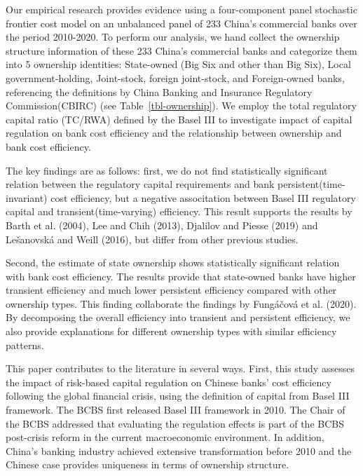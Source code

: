 \documentclass[
  12pt,
  a4paper,
]{scrreprt}
\begin{document}
{{{{Our empirical research provides evidence using a four-component panel
stochastic frontier cost model on an unbalanced panel of 233 China's
commercial banks over the period 2010-2020. To perform our analysis, we
hand collect the ownership structure information of these 233 China's
commercial banks and categorize them into 5 ownership identities:
State-owned (Big Six and other than Big Six), Local government-holding,
Joint-stock, foreign joint-stock, and Foreign-owned banks, referencing
the definitions by China Banking and Insurance Regulatory
Commission(CBIRC) (see Table~\ref{tbl-ownership}). We employ the total
regulatory capital ratio (TC/RWA) defined by the Basel III to
investigate impact of capital regulation on bank cost efficiency and the
relationship between ownership and bank cost efficiency.

The key findings are as follows: first, we do not find statistically
significant relation between the regulatory capital requirements and
bank persistent(time-invariant) cost efficiency, but a negative
associtation between Basel III regulatory capital and
transient(time-varying) efficiency. This result supports the results by
Barth et al. (2004), Lee and Chih (2013), Djalilov and Piesse (2019) and
Lešanovská and Weill (2016), but differ from other previous studies.

Second, the estimate of state ownership shows statistically significant
relation with bank cost efficiency. The results provide that state-owned
banks have higher transient efficiency and much lower persistent
efficiency compared with other ownership types. This finding collaborate
the findings by Fungáčová et al. (2020). By decomposing the overall
efficiency into transient and persistent efficiency, we also provide
explanations for different ownership types with similar efficiency
patterns.

This paper contributes to the literature in several ways. First, this
study assesses the impact of risk-based capital regulation on Chinese
banks' cost efficiency following the global financial crisis, using the
definition of capital from Basel III framework. The BCBS first released
Basel III framework in 2010. The Chair of the BCBS addressed that
evaluating the regulation effects is part of the BCBS post-crisis reform
in the current macroeconomic environment. In addition, China's banking
industry achieved extensive transformation before 2010 and the Chinese
case provides uniqueness in terms of ownership structure.

}}}}
\end{document}

